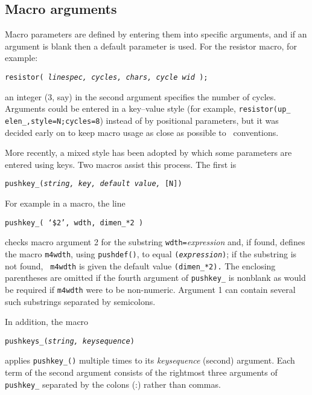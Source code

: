 \subsection{Macro arguments\label{Macroarguments:}}
Macro parameters are defined
by entering them into specific arguments, and if an argument is blank then
a default parameter is used.
For the resistor macro, for example:

{\tt resistor( {\sl linespec, cycles, chars, cycle wid} );}

\noindent
an integer (3, say) in the second argument specifies the number of cycles.
Arguments could be entered in a key--value style (for example,
{\tt resistor(up\_ elen\_,style=N;cycles=8}) instead of by positional
parameters, but it was decided early on
to keep macro usage as close as possible to \pic\ conventions.

More recently, a mixed style has been adopted by which some
parameters are entered using keys.  Two macros assist this process.
The first is

{\tt pushkey\_({\sl string, key, default value, }[N])}

For example in a macro, the line

{\tt pushkey\_( `\$2', wdth, dimen\_*2 )}

\noindent
checks macro argument 2 for the substring {\tt wdth=}{\sl expression}
and, if found, defines the macro {\tt m4wdth}, using {\tt pushdef()},
to equal {\tt ({\sl expression})}; if the substring is not found, {\tt
m4wdth} is given the default value {\tt (dimen\_*2).} The enclosing
parentheses are omitted if the fourth argument of {\tt pushkey\_} is
nonblank as would be required if {\tt m4wdth} were to be non-numeric.
Argument 1 can contain several such substrings separated by semicolons.

In addition, the macro

{\tt pushkeys\_({\sl string, keysequence})}

\noindent
applies {\tt pushkey\_()} multiple times to its {\sl keysequence}
(second) argument.
Each term of the second argument consists of the rightmost three
arguments of {\tt pushkey\_} separated by the colons (:) rather than commas.

%
%

